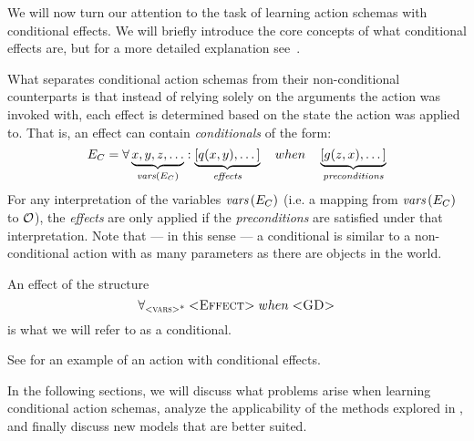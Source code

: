 \documentclass[../Master.tex]{subfiles}
\begin{document}
We will now turn our attention to the task of learning action schemas with conditional effects. 
We will briefly introduce the core concepts of what conditional effects are, but for a more detailed explanation see~. 

What separates conditional action schemas from their non-conditional counterparts is that instead of relying solely on the arguments the action was invoked with, each effect is determined based on the state the action was applied to. That is, an effect can contain \emph{conditionals} of the form:
\begin{equation*}
    E_C = \forall \underbrace{x, y, z, \dots}_{\textit{vars} \left(E_C\right)} : 
    \underbrace{\left[ q(x, y), \dots \right]}_{\textit{effects}} \quad when \quad 
    \underbrace{\left[ g(z, x), \dots  \right]}_{\textit{preconditions}}
\end{equation*}
For any interpretation of the variables $\textit{vars}\left(E_C\right)$ (i.e. a mapping from $\textit{vars}\left(E_C\right)$ to $\mathcal{O}$), the \textit{effects} are only applied if the \textit{preconditions} are satisfied under that interpretation. Note that --- in this sense --- a conditional is similar to a non-conditional action with as many parameters as there are objects in the world. 

\begin{definition}[Conditional]
	An effect of the structure 
	\begin{equation}
		\forall_{\textsc{<vars>*}} \; \textsc{<Effect>} \; when \; \textsc{<GD>}
	\end{equation} is what we will refer to as a conditional.
\end{definition}


See  for an example of an action with conditional effects. 

In the following sections, we will discuss what problems arise when learning conditional action schemas, analyze the applicability of the methods explored in , and finally discuss new models that are better suited.
\end{document}
